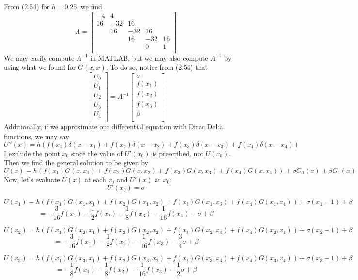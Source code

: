 \documentclass{article}
\begin{document}
From (2.54) for $h = 0.25$, we find
\[A = \begin{bmatrix}
    -4 & 4 & & & \\
    16 & -32 & 16 & & \\
     & 16 & -32 & 16 & \\
     & & 16 & -32 & 16\\
     & & & 0 & 1\\
\end{bmatrix}\]
We may easily compute $A^{-1}$ in MATLAB, but we may also compute $A^{-1}$ by using what we found for $G(x,\bar{x})$. To do so, notice from (2.54) that 
\[\begin{bmatrix}
    U_0\\
    U_1\\
    U_2\\
    U_3\\
    U_4\\
\end{bmatrix} = A^{-1}
\begin{bmatrix}
    \sigma \\
    f(x_1)\\
    f(x_2)\\
    f(x_3)\\
    \beta\\
\end{bmatrix}\]
Additionally, if we approximate our differential equation with Dirac Delta functions, we may say
\[U''(x) = h(f(x_1)\delta(x - x_1) + f(x_2)\delta(x - x_2) + f(x_3)\delta(x - x_3) + f(x_4)\delta(x - x_4))\]
I exclude the point $x_0$ since the value of $U'(x_0)$ is prescribed, not $U(x_0)$. Then we find the general solution to be given by
\[U(x) = h(f(x_1)G(x,x_1) + f(x_2)G(x,x_2) + f(x_3)G(x, x_3) + f(x_4)G(x,x_4)) + \sigma G_0(x) + \beta G_1(x)\]
Now, let's evaluate $U(x)$ at each $x_j$ and $U'(x)$ at $x_0$:
\[U'(x_0) = \sigma\]

\[U(x_1) = h(f(x_1)G(x_1,x_1) + f(x_2)G(x_1, x_2) + f(x_3)G(x_1,x_3) + f(x_4)G(x_1,x_4)) + \sigma (x_1 - 1) + \beta\]
\[ = - \frac{3}{16}f(x_1) - \frac{1}{2}f(x_2) - \frac{1}{8}f(x_3) - \frac{1}{16}f(x_4) - \sigma + \beta\]

\[U(x_2) = h(f(x_1)G(x_2, x_1) + f(x_2)G(x_2, x_2) + f(x_3)G(x_2, x_3) + f(x_4)G(x_2, x_4)) + \sigma (x_2 - 1) + \beta\]
\[= -\frac{3}{16}f(x_1) - \frac{1}{8}f(x_2) - \frac{1}{16}f(x_3) - \frac{3}{4}\sigma  + \beta\]

\[U(x_3) = h(f(x_1)G(x_3,x_1) + f(x_2)G(x_3,x_2) + f(x_3)G(x_3,x_3) + f(x_4)G(x_3,x_4)) + \sigma (x_3 - 1) + \beta\]
\[ = -\frac{1}{8}f(x_1) - \frac{1}{8}f(x_2) - \frac{1}{16}f(x_3) - \frac{1}{2}\sigma + \beta\]
\end{document}

